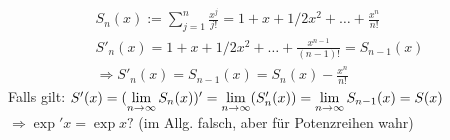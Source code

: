 \documentclass[../ana1.tex]{subfiles}
\begin{document}
\begin{bem}
	\begin{align*}
		S_n(x):= \sum_{j=1}^{n} \frac{x^j}{j!} = 1 + x + 1/2x^2 + \dots + \frac{x^n}{n!}\\
		S'_n(x) = 1 + x + 1/2x^2 + \dots + \frac{x^{n-1}}{(n-1)!} = S_{n-1}(x)\\
		\Rightarrow S'_n(x) = S_{n-1}(x) = S_n(x) - \frac{x^n}{n!}
	\end{align*}
	Falls gilt: \( S'(x) = ( \lim\limits_{n\rightarrow\infty}S_n(x) )' = \lim\limits_{n\rightarrow\infty}(S'_n(x)) = \lim\limits_{n\rightarrow\infty}S_{n-1}(x) = S(x) \)
	\( \Rightarrow \exp'x = \exp x? \) (im Allg. falsch, aber für Potenzreihen wahr)
\end{bem}
\end{document}

